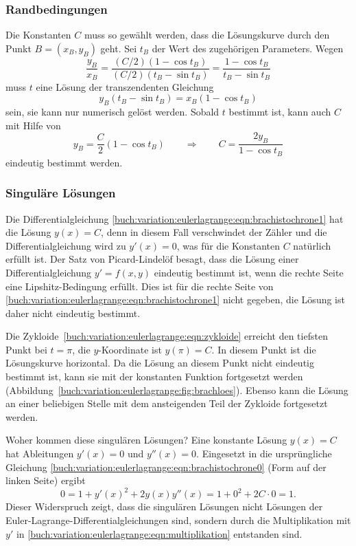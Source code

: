 %
%
\subsubsection{Randbedingungen}
Die Konstanten $C$ muss so gewählt werden, dass die Lösungskurve
durch den Punkt $B=(x_B,y_B)$ geht. 
Sei $t_B$ der Wert des zugehörigen Parameters.
Wegen
\[
\frac{y_B}{x_B}
=
\frac{(C/2)(1-\cos t_B)}{(C/2)(t_B-\sin t_B)}
=
\frac{1-\cos t_B}{t_B-\sin t_B}
\]
muss $t$ eine Lösung der transzendenten Gleichung
\[
y_B(t_B-\sin t_B)=x_B(1-\cos t_B)
\]
sein, sie kann nur numerisch gelöst werden.
Sobald $t$ bestimmt ist, kann auch $C$ mit Hilfe von
\[
y_B = \frac{C}2(1-\cos t_B)
\qquad\Rightarrow\qquad
C
=
\frac{2y_B}{1-\cos t_B}
\]
eindeutig bestimmt werden.

%
%
\subsubsection{Singuläre Lösungen}

Die Differentialgleichung
\eqref{buch:variation:eulerlagrange:eqn:brachistochrone1}
hat die Lösung $y(x)=C$, denn in diesem Fall verschwindet
der Zähler und die Differentialgleichung wird zu $y'(x)=0$,
was für die Konstanten $C$ natürlich erfüllt ist.
Der Satz von Picard-Lindelöf besagt, dass die Lösung einer
Differentialgleichung $y'=f(x,y)$ eindeutig bestimmt ist, wenn die rechte
Seite eine Lipshitz-Bedingung erfüllt.
Dies ist für die rechte Seite von
\eqref{buch:variation:eulerlagrange:eqn:brachistochrone1}
nicht gegeben, die Lösung ist daher nicht eindeutig bestimmt.

Die Zykloide~\eqref{buch:variation:eulerlagrange:eqn:zykloide}
erreicht den tiefsten Punkt bei $t=\pi$, die $y$-Koordinate ist
$y(\pi)=C$.
In diesem Punkt ist die Lösungskurve horizontal.
Da die Lösung an diesem Punkt nicht eindeutig bestimmt ist,
kann sie mit der konstanten Funktion fortgesetzt werden
(Abbildung~\ref{buch:variation:eulerlagrange:fig:brachloes}).
Ebenso kann die Lösung an einer beliebigen Stelle mit dem ansteigenden
Teil der Zykloide fortgesetzt werden.

Woher kommen diese singulären Lösungen?
Eine konstante Lösung $y(x)=C$ hat Ableitungen
$y'(x)=0$ und $y''(x)=0$.
Eingesetzt in die ursprüngliche Gleichung
\eqref{buch:variation:eulerlagrange:eqn:brachistochrone0}
(Form auf der linken Seite) ergibt
\[
0
=
1+y'(x)^2+2y(x)y''(x)
=
1 + 0^2 + 2C\cdot 0
=
1.
\]
Dieser Widerspruch zeigt, dass die singulären Lösungen nicht
Lösungen der Euler-Lagrange-Differentialgleichungen sind, sondern
durch die Multiplikation mit $y'$ in
\eqref{buch:variation:eulerlagrange:eqn:multiplikation}
entstanden sind.

